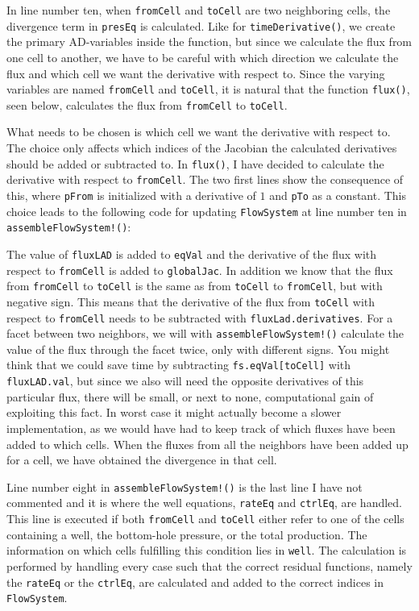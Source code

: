 In line number ten, when \texttt{fromCell} and \texttt{toCell} are two neighboring cells, the divergence term in \texttt{presEq} is calculated. Like for \texttt{timeDerivative()}, we create the primary AD-variables inside the function, but since we calculate the flux from one cell to another, we have to be careful with which direction we calculate the flux and which cell we want the derivative with respect to. Since the varying variables are named \texttt{fromCell} and \texttt{toCell}, it is natural that the function \texttt{flux()}, seen below, calculates the flux from \texttt{fromCell} to \texttt{toCell}. 

What needs to be chosen is which cell we want the derivative with respect to. The choice only affects which indices of the Jacobian the calculated derivatives should be added or subtracted to. In \texttt{flux()}, I have decided to calculate the derivative with respect to \texttt{fromCell}. The two first lines show the consequence of this, where \texttt{pFrom} is initialized with a derivative of $1$ and \texttt{pTo} as a constant. This choice leads to the following code for updating \texttt{FlowSystem} at line number ten in \texttt{assembleFlowSystem!()}:

The value of \texttt{fluxLAD} is added to \texttt{eqVal} and the derivative of the flux with respect to \texttt{fromCell} is added to \texttt{globalJac}. In addition we know that the flux from \texttt{fromCell} to \texttt{toCell} is the same as from \texttt{toCell} to \texttt{fromCell}, but with negative sign. This means that the derivative of the flux from \texttt{toCell} with respect to \texttt{fromCell} needs to be subtracted with \texttt{fluxLad.derivatives}. For a facet between two neighbors, we will with \texttt{assembleFlowSystem!()} calculate the value of the flux through the facet twice, only with different signs. You might think that we could save time by subtracting \texttt{fs.eqVal[toCell]} with \texttt{fluxLAD.val}, but since we also will need the opposite derivatives of this particular flux, there will be small, or next to none, computational gain of exploiting this fact. In worst case it might actually become a slower implementation, as we would have had to keep track of which fluxes have been added to which cells. When the fluxes from all the neighbors have been added up for a cell, we have obtained the divergence in that cell. 

Line number eight in \texttt{assembleFlowSystem!()} is the last line I have not commented and it is where the well equations, \texttt{rateEq} and \texttt{ctrlEq}, are handled. This line is executed if both \texttt{fromCell} and \texttt{toCell} either refer to one of the cells containing a well, the bottom-hole pressure, or the total production. The information on which cells fulfilling this condition lies in \texttt{well}. The calculation is performed by handling every case such that the correct residual functions, namely the \texttt{rateEq} or the \texttt{ctrlEq}, are calculated and added to the correct indices in \texttt{FlowSystem}.


